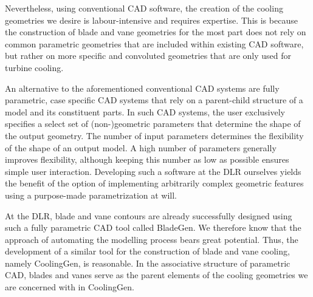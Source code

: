 \documentclass[a4paper, 11pt]{report}
\theoremstyle{definition}
\begin{document}
		Nevertheless, using conventional CAD software, the creation of the cooling geometries we desire is labour-intensive and requires expertise. This is because the construction of blade and vane geometries for the most part does not rely on common parametric geometries that are included within existing CAD software, but rather on more specific and convoluted geometries that are only used for turbine cooling.

		An alternative to the aforementioned conventional CAD systems are fully parametric, case specific CAD systems that rely on a parent-child structure of a model and its constituent parts. In such CAD systems, the user exclusively specifies a select set of (non-)geometric parameters that determine the shape of the output geometry. The number of input parameters determines the flexibility of the shape of an output model. A high number of parameters generally improves flexibility, although keeping this number as low as possible ensures simple user interaction. Developing such a software at the DLR ourselves yields the benefit of the option of implementing arbitrarily complex geometric features using a purpose-made parametrization at will.

		At the DLR, blade and vane contours are already successfully designed using such a fully parametric CAD tool called BladeGen. We therefore know that the approach of automating the modelling process bears great potential. Thus, the development of a similar tool for the construction of blade and vane cooling, namely CoolingGen, is reasonable. In the associative structure of parametric CAD, blades and vanes serve as the parent elements of the cooling geometries we are concerned with in CoolingGen.
	
\end{document}
